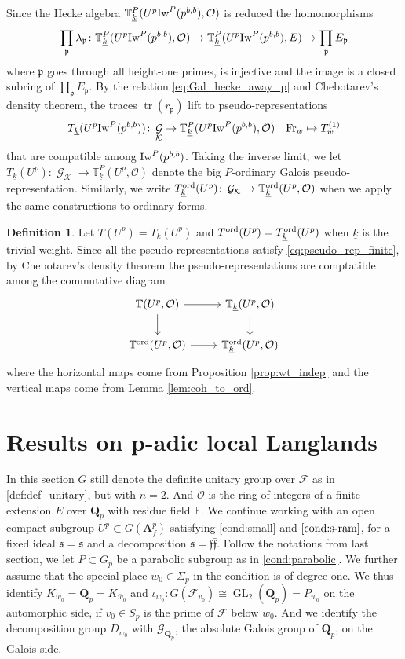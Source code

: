 \documentclass[leqno]{amsart}
\theoremstyle{definition}
\newtheorem{defn}[thm]{Definition}
\theoremstyle{remark}
\newcommand{\oo}{\mathcal{O}}
\newcommand{\fF}{\mathbb{F}} %
\newcommand{\Qp}{\mathbf{Q}_p}
\newcommand{\A}{\mathbf A}
\DeclareMathOperator{\GL}{GL}
\DeclareMathOperator{\mtr}{tr}
\DeclareMathOperator{\Gal}{\mathcal{G}}
\newcommand{\Fr}{\textnormal{Fr}} %
\newcommand{\ff}{\mathfrak{f}}
\newcommand{\fp}{\mathfrak{p}}
\newcommand{\fs}{\mathfrak{s}}
\newcommand{\Gp}{\mathcal{G}_{\Qp}} %
\newcommand{\F}{{\mathcal{F}}} %
\newcommand{\K}{{\mathcal{K}}} %
\newcommand{\wt}[1]{\underline{ #1 }}
\newcommand{\Iw}{\textnormal{Iw}} %
\newcommand{\TT}{\mathbb{T}} %
\newcommand{\ord}{\textnormal{ord}} %
\begin{document}
Since the Hecke algebra 
$\TT^P_{\wt{k}}(U^p\Iw^P(p^{b,b}),\oo)$
is reduced the homomorphisms
\[
	\prod_{\fp}\lambda_{\fp}\colon 
	\TT^P_{\wt{k}}(U^p\Iw^P(p^{b,b}),\oo)\to 
	\TT^P_{\wt{k}}(U^p\Iw^P(p^{b,b}),E)\to  
	\prod_{\fp}E_{\fp}
\]
where $\fp$ goes through all height-one primes,
is injective and the image is
a closed subring of $\prod_{\fp}E_{\fp}$.
By the relation \eqref{eq:Gal_hecke_away_p}
and Chebotarev's density theorem,
the traces  $\mtr(r_{\fp})$
lift to pseudo-representations
\begin{equation}\label{eq:pseudo_rep_finite}
	T_{\wt{k}}(U^p\Iw^P(p^{b,b}))\colon \Gal_{\K}
	\to \TT^P_{\wt{k}}(U^p\Iw^P(p^{b,b}),\oo)\quad
	\Fr_w\mapsto T_w^{(1)}
\end{equation}
that are compatible among $\Iw^P(p^{b,b})$.
Taking the inverse limit,
we let 
$T_{\wt{k}}(U^p)\colon \Gal_{\K} \to \TT^P_{\wt{k}}(U^p,\oo)$
denote the big $P$-ordinary Galois pseudo-representation.
Similarly, we write 
$T_{\wt{k}}^{\ord}(U^p)\colon \Gal_{\K} \to \TT^{\ord}_{\wt{k}}(U^p,\oo)$
when we apply the same constructions to ordinary forms.

\begin{defn}\label{def:big_Gal}
Let $T(U^p)=T_{\wt{k}}(U^p)$ and 
$T^{\ord}(U^p)=T_{\wt{k}}^{\ord}(U^p)$
when $\wt{k}$ is the trivial weight.
Since all the pseudo-representations satisfy 
\eqref{eq:pseudo_rep_finite},
by Chebotarev's density theorem 
the pseudo-representations are comptatible among
the commutative diagram
\[
\begin{tikzcd}
    \TT(U^p,\oo) 
    \arrow[r] \arrow[d]&
    \TT_{\wt{k}}(U^p,\oo) 
    \arrow[d]\\
    \TT^{\ord}(U^p,\oo) 
    \arrow[r] &
    \TT^{\ord}_{\wt{k}}(U^p,\oo) 
\end{tikzcd}
\]
where the horizontal maps come from Proposition \ref{prop:wt_indep}
and the vertical maps come from Lemma \ref{lem:coh_to_ord}.
\end{defn}


\section{Results on p-adic local Langlands}

In this section $G$ still denote the definite unitary group
over $\F$ as in \eqref{def:def_unitary}, but with $n=2$.
And $\oo$ is the ring of integers of a finite extension
$E$ over $\Qp$ with residue field $\fF$.
We continue working with an open compact subgroup
$U^p\subset G(\A_f^p)$ satisfying 
\eqref{cond:small} and $\eqref{cond:s-ram}$,
for a fixed ideal $\fs=\bar{\fs}$ and a decomposition $\fs=\ff\bar{\ff}$.
Follow the notations from last section,
we let $P\subset G_p$ be a parabolic subgroup
as in \eqref{cond:parabolic}.
We further assume that the special place $w_0\in \Sigma_p$
in the condition is of degree one.
We thus identify $K_{w_0}=\Qp=K_{\bar{w}_0}$
and $\iota_{w_0}\colon G(\F_{v_0})\cong \GL_2(\Qp)=P_{w_0}$
on the automorphic side,
if $v_0\in S_p$ is the prime of $\F$ below $w_0$.
And we identify the decomposition group
$D_{w_0}$ with $\Gp$, the absolute Galois group of  $\Qp$,
on the Galois side.
\end{document}
